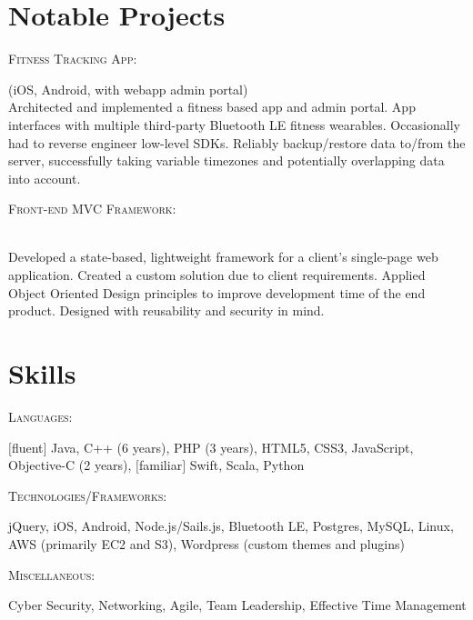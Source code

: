 \documentclass[letterpaper]{article} %
\begin{document}
\section{Notable Projects}
\vspace{0.5em}


\noindent\begin{large}\textsc{Fitness Tracking App:}\end{large} (iOS, Android, with webapp admin portal)\\
Architected and implemented a fitness based app and admin portal. App interfaces with multiple third-party Bluetooth LE fitness wearables. Occasionally had to reverse engineer low-level SDKs. Reliably backup/restore data to/from the server, successfully taking variable timezones and potentially overlapping data into account.


\noindent\begin{large}\textsc{Front-end MVC Framework:}\end{large}\\
Developed a state-based, lightweight framework for a client's single-page web application. Created a custom solution due to client requirements. Applied Object Oriented Design principles to improve development time of the end product. Designed with reusability and security in mind.



\section{Skills}
\vspace{0.5em}
\noindent\begin{large}\textsc{Languages:}\end{large}
\([\)fluent\(]\) Java, C++ (6 years), PHP (3 years), HTML5, CSS3, JavaScript, Objective-C (2 years), \([\)familiar\(]\) Swift, Scala, Python


\noindent\begin{large}\textsc{Technologies/Frameworks:}\end{large}
jQuery, iOS, Android, Node.js/Sails.js, Bluetooth LE, Postgres, MySQL, Linux, AWS (primarily EC2 and S3), Wordpress (custom themes and plugins)

\noindent\begin{large}\textsc{Miscellaneous:}\end{large} Cyber Security, Networking, Agile, Team Leadership, Effective Time Management
\end{document}
